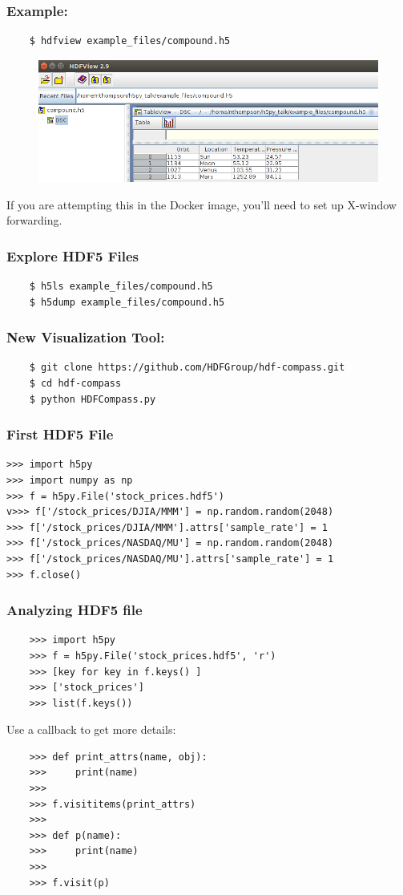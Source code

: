 \documentclass[9pt]{beamer}
\begin{document}
\begin{frame}[fragile]
  \frametitle{Example:}

  \begin{verbatim}
    $ hdfview example_files/compound.h5
  \end{verbatim}
  \begin{figure}
    \includegraphics[scale=0.3]{fig/hdfview.png}
  \end{figure}
  \pause
  If you are attempting this in the Docker image, you'll need to set up X-window forwarding.
\end{frame}

\begin{frame}[fragile]
  \frametitle{Explore HDF5 Files}
  \begin{verbatim}
    $ h5ls example_files/compound.h5
    $ h5dump example_files/compound.h5
  \end{verbatim}
\end{frame}

\begin{frame}[fragile]
  \frametitle{New Visualization Tool:}
  \begin{verbatim}
    $ git clone https://github.com/HDFGroup/hdf-compass.git
    $ cd hdf-compass
    $ python HDFCompass.py
  \end{verbatim}
\end{frame}


\begin{frame}[fragile]
\frametitle{First HDF5 File}
\begin{verbatim}
>>> import h5py
>>> import numpy as np
>>> f = h5py.File('stock_prices.hdf5')
v>>> f['/stock_prices/DJIA/MMM'] = np.random.random(2048)
>>> f['/stock_prices/DJIA/MMM'].attrs['sample_rate'] = 1
>>> f['/stock_prices/NASDAQ/MU'] = np.random.random(2048)
>>> f['/stock_prices/NASDAQ/MU'].attrs['sample_rate'] = 1
>>> f.close()
\end{verbatim}
\end{frame}

\begin{frame}[fragile]
  \frametitle{Analyzing HDF5 file}
  \begin{verbatim}
    >>> import h5py
    >>> f = h5py.File('stock_prices.hdf5', 'r')
    >>> [key for key in f.keys() ]
    >>> ['stock_prices']
    >>> list(f.keys())
  \end{verbatim}
  \pause
  Use a callback to get more details:
  \begin{verbatim}
    >>> def print_attrs(name, obj):
    >>>     print(name)
    >>>
    >>> f.visititems(print_attrs)
    >>>
    >>> def p(name):
    >>>     print(name)
    >>>
    >>> f.visit(p)
  \end{verbatim}
\end{frame}
\end{document}
